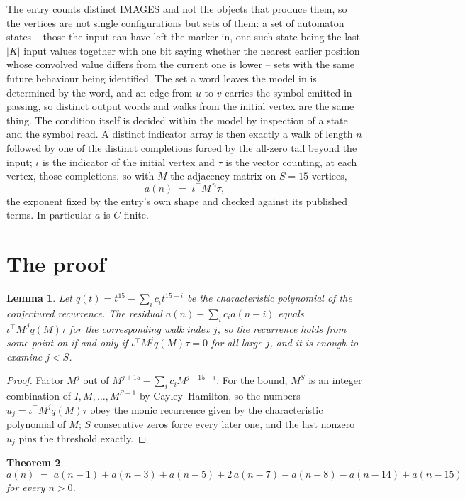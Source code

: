 \documentclass[11pt,a4paper]{article}
\theoremstyle{plain}
\newtheorem{theorem}{Theorem}
\newtheorem{lemma}[theorem]{Lemma}
\theoremstyle{definition}
\begin{document}
The entry counts distinct IMAGES and not the objects that produce them, so the vertices are not single configurations but sets of them: a set of automaton states -- those the input can have left the marker in, one such state being the last $|K|$ input values together with one bit saying whether the nearest earlier position whose convolved value differs from the current one is lower -- sets with the same future behaviour being identified. The set a word leaves the model in is determined by the word, and an edge from $u$ to $v$ carries the symbol emitted in passing, so distinct output words and walks from the initial vertex are the same thing. The condition itself is decided within the model by inspection of a state and the symbol read.
A distinct indicator array is then exactly a walk of length $n$ followed by one of the distinct completions forced by the all-zero tail beyond the input; $\iota$ is the indicator of the initial vertex and $\tau$ is the vector counting, at each vertex, those completions, so with $M$ the adjacency matrix on $S=15$ vertices,
\[
a(n)\;=\;\iota^{\!\top}M^{\,n}\tau ,
\]
the exponent fixed by the entry's own shape and checked against its published terms. In
particular $a$ is $C$-finite.

\section{The proof}

\begin{lemma}\label{lem:crit}
Let $q(t)=t^{15}-\sum_i c_it^{15-i}$ be the characteristic polynomial of the
conjectured recurrence. The residual $a(n)-\sum_ic_ia(n-i)$ equals
$\iota^{\!\top}M^{\,j}q(M)\tau$ for the corresponding walk index $j$, so the recurrence
holds from some point on if and only if $\iota^{\!\top}M^{j}q(M)\tau=0$ for all large $j$,
and it is enough to examine $j<S$.
\end{lemma}

\begin{proof}
Factor $M^{j}$ out of $M^{j+15}-\sum_ic_iM^{j+15-i}$. For the bound, $M^{S}$
is an integer combination of $I,M,\dots,M^{S-1}$ by Cayley--Hamilton, so the numbers
$u_j=\iota^{\!\top}M^{j}q(M)\tau$ obey the monic recurrence given by the characteristic
polynomial of $M$; $S$ consecutive zeros force every later one, and the last nonzero $u_j$
pins the threshold exactly.
\end{proof}

\begin{theorem}
\[
a(n)\;=\;a(n-1) + a(n-3) + a(n-5) + 2\,a(n-7) - a(n-8) - a(n-14) + a(n-15)
\]
for every $n>0$.
\end{theorem}
\end{document}
